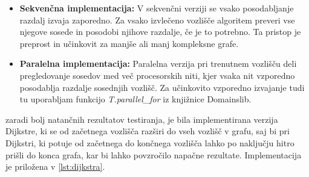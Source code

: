\documentclass[mat1, tisk]{fmfdelo}
\begin{document}
\begin{itemize}
  \item \textbf{Sekvenčna implementacija: } V sekvenčni verziji se vsako posodabljanje razdalj izvaja zaporedno.
    Za vsako izvlečeno vozlišče algoritem preveri vse njegove sosede in posodobi njihove razdalje, če je to potrebno.
    Ta pristop je preprost in učinkovit za manjše ali manj kompleksne grafe.
  \item \textbf{Paralelna implementacija: } Paralelna verzija pri trenutnem vozlišču deli pregledovanje sosedov med
    več procesorskih niti, kjer vsaka nit vzporedno posodablja razdalje sosednjih vozlišč. Za učinkovito vzporedno
    izvajanje tudi tu uporabljam funkcijo \textit{T.parallel\_for} iz knjižnice Domainslib.
\end{itemize}

zaradi bolj natančnih rezultatov testiranja, je bila implementirana verzija Dijkstre, ki se od začetnega vozlišča
razširi do vseh vozlišč v grafu, saj bi pri Dijkstri, ki potuje od začetnega do končnega vozlišča lahko po naključju
hitro prišli do konca grafa, kar bi lahko povzročilo napačne rezultate. Implementacija je priložena v \ref{lst:dijkstra}.
\end{document}
